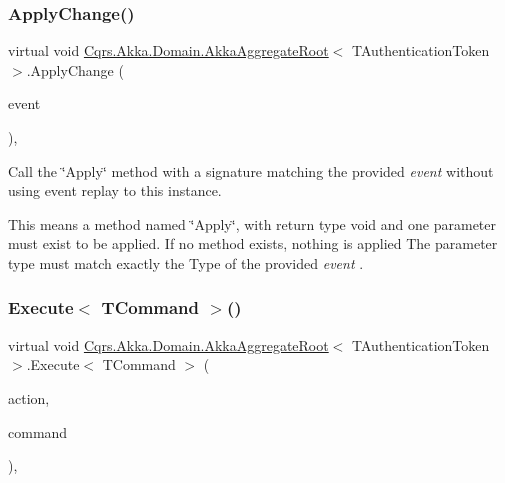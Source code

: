 \subsubsection{\texorpdfstring{Apply\+Change()}{ApplyChange()}}
{\footnotesize\ttfamily virtual void \hyperlink{classCqrs_1_1Akka_1_1Domain_1_1AkkaAggregateRoot}{Cqrs.\+Akka.\+Domain.\+Akka\+Aggregate\+Root}$<$ T\+Authentication\+Token $>$.Apply\+Change (\begin{DoxyParamCaption}\item[{\hyperlink{interfaceCqrs_1_1Events_1_1IEvent}{I\+Event}$<$ T\+Authentication\+Token $>$ @}]{event }\end{DoxyParamCaption})\hspace{0.3cm}{\ttfamily [protected]}, {\ttfamily [virtual]}}



Call the \char`\"{}\+Apply\char`\"{} method with a signature matching the provided {\itshape event}  without using event replay to this instance. 

This means a method named \char`\"{}\+Apply\char`\"{}, with return type void and one parameter must exist to be applied. If no method exists, nothing is applied The parameter type must match exactly the Type of the provided {\itshape event} . \mbox{\label{classCqrs_1_1Akka_1_1Domain_1_1AkkaAggregateRoot_af8a9bd0e80498b3b54beb7cbec820533_af8a9bd0e80498b3b54beb7cbec820533}} 
\subsubsection{\texorpdfstring{Execute$<$ T\+Command $>$()}{Execute< TCommand >()}}
{\footnotesize\ttfamily virtual void \hyperlink{classCqrs_1_1Akka_1_1Domain_1_1AkkaAggregateRoot}{Cqrs.\+Akka.\+Domain.\+Akka\+Aggregate\+Root}$<$ T\+Authentication\+Token $>$.Execute$<$ T\+Command $>$ (\begin{DoxyParamCaption}\item[{Action$<$ T\+Command $>$}]{action,  }\item[{T\+Command}]{command }\end{DoxyParamCaption})\hspace{0.3cm}{\ttfamily [protected]}, {\ttfamily [virtual]}}




